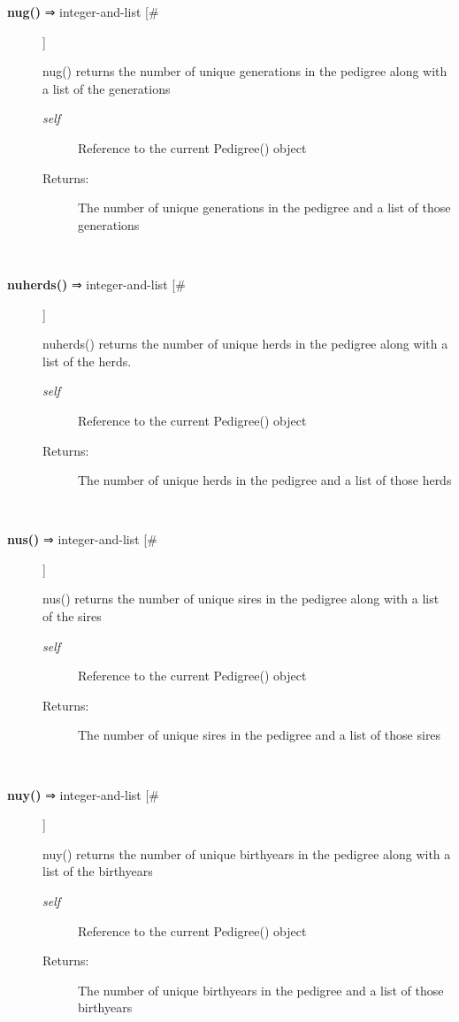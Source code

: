 \begin{description}
\item[\textbf{nug()} ⇒ integer-and-list [\#]
]
\par nug() returns the number of unique generations in the pedigree along with a list of the generations
\begin{description}
\item[\textit{self}
]
Reference to the current Pedigree() object
\item[Returns:
]
The number of unique generations in the pedigree and a list of those generations
\end{description}\\

\item[\textbf{nuherds()} ⇒ integer-and-list [\#]
]
\par nuherds() returns the number of unique herds in the pedigree along with a list of the herds.
\begin{description}
\item[\textit{self}
]
Reference to the current Pedigree() object
\item[Returns:
]
The number of unique herds in the pedigree and a list of those herds
\end{description}\\

\item[\textbf{nus()} ⇒ integer-and-list [\#]
]
\par nus() returns the number of unique sires in the pedigree along with a list of the sires
\begin{description}
\item[\textit{self}
]
Reference to the current Pedigree() object
\item[Returns:
]
The number of unique sires in the pedigree and a list of those sires
\end{description}\\

\item[\textbf{nuy()} ⇒ integer-and-list [\#]
]
\par nuy() returns the number of unique birthyears in the pedigree along with a list of the birthyears
\begin{description}
\item[\textit{self}
]
Reference to the current Pedigree() object
\item[Returns:
]
The number of unique birthyears in the pedigree and a list of those birthyears
\end{description}\\


\end{description}
